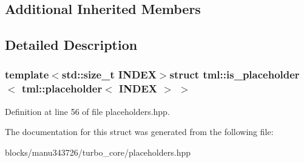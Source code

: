 \subsection*{Additional Inherited Members}


\subsection{Detailed Description}
\subsubsection*{template$<$std\+::size\+\_\+t I\+N\+D\+E\+X$>$struct tml\+::is\+\_\+placeholder$<$ tml\+::placeholder$<$ I\+N\+D\+E\+X $>$ $>$}



Definition at line 56 of file placeholders.\+hpp.



The documentation for this struct was generated from the following file\+:\begin{DoxyCompactItemize}
\item 
blocks/manu343726/turbo\+\_\+core/placeholders.\+hpp\end{DoxyCompactItemize}
